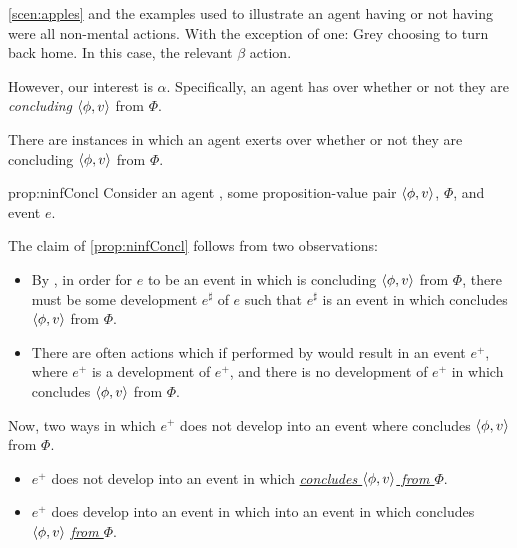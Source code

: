 \begin{note}
  \nocite{Peacocke:2021aa}
  \autoref{scen:apples} and the examples used to illustrate an agent having or not having \ninf{} were all non-mental actions.
  With the exception of one:
  Grey choosing to turn back home.
  In this case, the relevant \(\beta\) action.

  However, our interest is \(\alpha\).
  Specifically, an agent has \ninf{} over whether or not they are \emph{concluding} \(\langle \phi, v \rangle\) from \(\Phi\).

  \begin{proposition}
    \label{prop:ninfConcl}
    There are instances in which an agent exerts  over whether or not they are concluding \(\langle \phi, v \rangle\) from \(\Phi\).
  \end{proposition}

  \begin{argument}{prop:ninfConcl}
    Consider an agent \vAgent{}, some proposition-value pair \(\langle \phi, v \rangle\), \poP{} \(\Phi\), and event \(e\).

    The claim of \autoref{prop:ninfConcl} follows from two observations:

    \begin{itemize}[noitemsep]
    \item
      By , in order for \(e\) to be an event in which \vAgent{} is concluding \(\langle \phi, v \rangle\) from \(\Phi\), there must be some  development \(e^{\sharp}\) of \(e\) such that \(e^{\sharp}\) is an event in which \vAgent{} concludes \(\langle \phi, v \rangle\) from \(\Phi\).
    \end{itemize}

    \begin{itemize}
    \item
      There are often actions which if performed by \vAgent{} would result in an event \(e^{+}\), where \(e^{+}\) is a development of \(e^{+}\), and there is no  development of \(e^{+}\) in which \vAgent{} concludes \(\langle \phi, v \rangle\) from \(\Phi\).
    \end{itemize}

    Now, two ways in which \(e^{+}\) does not develop into an event where \vAgent{} concludes \(\langle \phi, v \rangle\) from \(\Phi\).
    \begin{itemize}
    \item
      \(e^{+}\) does not develop into an event in which \vAgent{} \emph{\underline{concludes \(\langle \phi, v \rangle\) from \(\Phi\)}}.
    \item
      \(e^{+}\) does develop into an event in which  into an event in which \vAgent{} concludes \(\langle \phi, v \rangle\) \emph{\underline{from \(\Phi\)}}.
    \end{itemize}


\end{argument}
\end{note}
